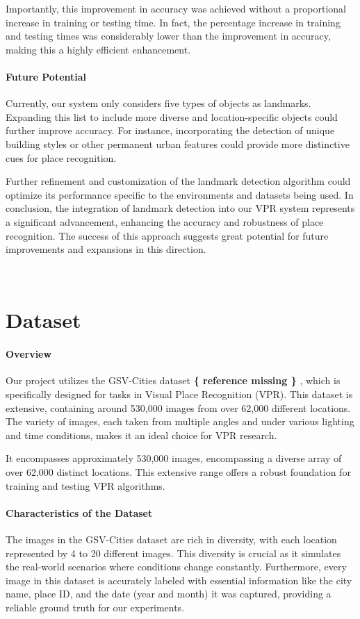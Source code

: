 \documentclass[conference]{IEEEtran}
\begin{document}
Importantly, this improvement in accuracy was achieved without a proportional increase in training or testing time. In fact, the percentage increase in training and testing times was considerably lower than the improvement in accuracy, making this a highly efficient enhancement.

\paragraph{Future Potential}


Currently, our system only considers five types of objects as landmarks. Expanding this list to include more diverse and location-specific objects could further improve accuracy.
For instance, incorporating the detection of unique building styles or other permanent urban features could provide more distinctive cues for place recognition.

Further refinement and customization of the landmark detection algorithm could optimize its performance specific to the environments and datasets being used.
In conclusion, the integration of landmark detection into our VPR system represents a significant advancement, enhancing the accuracy and robustness of place recognition. The success of this approach suggests great potential for future improvements and expansions in this direction.


\\

\section{Dataset}

\paragraph{Overview}
Our project utilizes the GSV-Cities dataset\textbf{ \{ reference missing \} }, which is specifically designed for tasks in Visual Place Recognition (VPR). This dataset is extensive, containing around 530,000 images from over 62,000 different locations. The variety of images, each taken from multiple angles and under various lighting and time conditions, makes it an ideal choice for VPR research.

It encompasses approximately 530,000 images, encompassing a diverse array of over 62,000 distinct locations. This extensive range offers a robust foundation for training and testing VPR algorithms.

\paragraph{Characteristics of the Dataset}
The images in the GSV-Cities dataset are rich in diversity, with each location represented by 4 to 20 different images. This diversity is crucial as it simulates the real-world scenarios where conditions change constantly. Furthermore, every image in this dataset is accurately labeled with essential information like the city name, place ID, and the date (year and month) it was captured, providing a reliable ground truth for our experiments.
\end{document}
